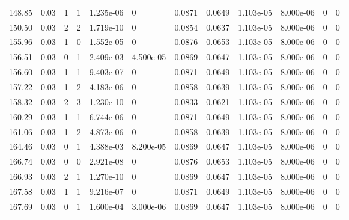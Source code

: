 \documentclass[preview]{standalone}
\begin{document}
{{{\begin{tabular}{L{1.2cm}C{1.2cm} C{0.3cm}C{0.5cm} C{1.4cm}C{1.4cm} C{1.4cm}C{1.4cm} C{1.6cm}C{1.6cm} C{1.6cm}C{1.6cm}}
  148.85  &  0.03  & 1     &  1 &  1.235e-06  & 0  &  0.0871&   0.0649& 1.103e-05 & 8.000e-06   &  0 & 0  \\ 
  150.50  &  0.03  & 2     &  2 &  1.719e-10  & 0  &  0.0854&   0.0637& 1.103e-05 & 8.000e-06   &  0 & 0  \\ 
  155.96  &  0.03  & 1     &  0 &  1.552e-05  & 0  &  0.0876&   0.0653& 1.103e-05 & 8.000e-06   &  0 & 0  \\ 
  156.51  &  0.03  & 0     &  1 &  2.409e-03  & 4.500e-05  &  0.0869&   0.0647& 1.103e-05 & 8.000e-06   &  0 & 0  \\ 
  156.60  &  0.03  & 1     &  1 &  9.403e-07  & 0  &  0.0871&   0.0649& 1.103e-05 & 8.000e-06   &  0 & 0  \\ 
  157.22  &  0.03  & 1     &  2 &  4.183e-06  & 0  &  0.0858&   0.0639& 1.103e-05 & 8.000e-06   &  0 & 0  \\ 
  158.32  &  0.03  & 2     &  3 &  1.230e-10  & 0  &  0.0833&   0.0621& 1.103e-05 & 8.000e-06   &  0 & 0  \\ 
  160.29  &  0.03  & 1     &  1 &  6.744e-06  & 0  &  0.0871&   0.0649& 1.103e-05 & 8.000e-06   &  0 & 0  \\ 
  161.06  &  0.03  & 1     &  2 &  4.873e-06  & 0  &  0.0858&   0.0639& 1.103e-05 & 8.000e-06   &  0 & 0  \\ 
  164.46  &  0.03  & 0     &  1 &  4.388e-03  & 8.200e-05  &  0.0869&   0.0647& 1.103e-05 & 8.000e-06   &  0 & 0  \\ 
  166.74  &  0.03  & 0     &  0 &  2.921e-08  & 0  &  0.0876&   0.0653& 1.103e-05 & 8.000e-06   &  0 & 0  \\ 
  166.93  &  0.03  & 2     &  1 &  1.270e-10  & 0  &  0.0869&   0.0647& 1.103e-05 & 8.000e-06   &  0 & 0  \\ 
  167.58  &  0.03  & 1     &  1 &  9.216e-07  & 0  &  0.0871&   0.0649& 1.103e-05 & 8.000e-06   &  0 & 0  \\ 
  167.69  &  0.03  & 0     &  1 &  1.600e-04  & 3.000e-06  &  0.0869&   0.0647& 1.103e-05 & 8.000e-06   &  0 & 0  \\ 
\hline 
\end{tabular} 

}}}
\end{document}
